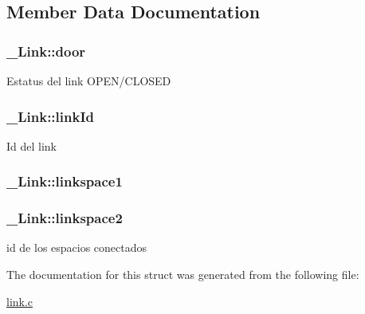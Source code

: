 \subsection{Member Data Documentation}
\hypertarget{struct__Link_ab4d6f65f126e9a41440828d2317b7a79}{
\subsubsection[{door}]{ \+\_\+\+Link\+::door}}\label{struct__Link_ab4d6f65f126e9a41440828d2317b7a79}
Estatus del link O\+P\+E\+N/\+C\+L\+O\+S\+E\+D \hypertarget{struct__Link_a3c2eb94d5f272bf373c113a868e3d367}{
\subsubsection[{link\+Id}]{ \+\_\+\+Link\+::link\+Id}}\label{struct__Link_a3c2eb94d5f272bf373c113a868e3d367}
Id del link \hypertarget{struct__Link_a851b2cb675c25aaa73ebbaa58b8db1a2}{
\subsubsection[{linkspace1}]{ \+\_\+\+Link\+::linkspace1}}\label{struct__Link_a851b2cb675c25aaa73ebbaa58b8db1a2}
\hypertarget{struct__Link_aac79e76abc5512cd08a381eb835d59f0}{
\subsubsection[{linkspace2}]{ \+\_\+\+Link\+::linkspace2}}\label{struct__Link_aac79e76abc5512cd08a381eb835d59f0}
id de los espacios conectados 

The documentation for this struct was generated from the following file\+:\begin{DoxyCompactItemize}
\item 
\hyperlink{link_8c}{link.\+c}\end{DoxyCompactItemize}
